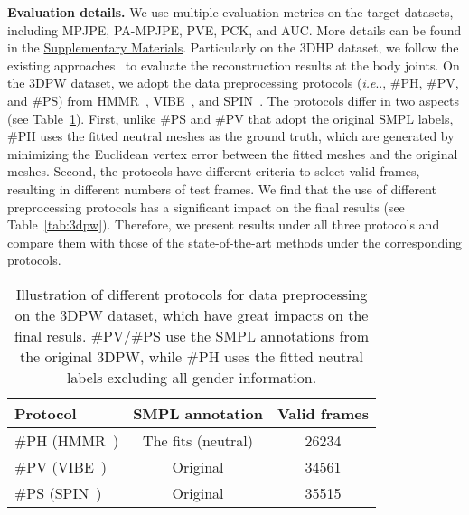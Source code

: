 \documentclass[10pt,journal,compsoc]{IEEEtran}
\makeatletter
\let\MYoriglatexcaption\caption
\renewcommand{\caption}[2][\relax]{\MYoriglatexcaption[#2]{#2}}
\DeclareRobustCommand\onedot{\futurelet\@let@token\@onedot}
\def\@onedot{\ifx\@let@token.\else.\null\fi\xspace}
\def\ie{\emph{i.e}\onedot} \def\Ie{\emph{I.e}\onedot}
\newcommand{\tab}[1]{Table~\ref{#1}}
\newcommand{\myparagraph}[1]{\vspace{5pt} \noindent \textbf{#1}}
\makeatother
\begin{document}
    
\myparagraph{Evaluation details.}
We use multiple evaluation metrics on the target datasets, including MPJPE, PA-MPJPE, PVE, PCK, and AUC. More details can be found in the \underline{Supplementary Materials}. 
Particularly on the 3DHP dataset, we follow the existing approaches~\cite{kolotouros2019learning, kanazawa2018end} to evaluate the reconstruction results at the  body joints.
On the 3DPW dataset, we adopt the data preprocessing protocols (\ie, \#PH, \#PV, and \#PS) from HMMR~\cite{DBLP:conf/cvpr/KanazawaZFM19}, VIBE~\cite{kocabas2020vibe}, and SPIN~\cite{kolotouros2019learning}.
The protocols differ in two aspects (see \tab{tab:setting_diff}). First, unlike \#PS and \#PV that adopt the original SMPL labels, \#PH uses the fitted neutral meshes as the ground truth, which are generated by minimizing the Euclidean vertex error between the fitted meshes and the original meshes. Second, the protocols have different criteria to select valid frames, resulting in different numbers of test frames.
We find that the use of different preprocessing protocols has a significant impact on the final results (see \tab{tab:3dpw}). Therefore, we present results under all three protocols and compare them with those of the state-of-the-art methods under the corresponding protocols.




\begin{table}[t]
    \centering
\caption{Illustration of different protocols for data preprocessing on the 3DPW dataset, which have great impacts on the final resuls. \#PV/\#PS use the SMPL annotations from the original 3DPW, while \#PH uses the fitted neutral labels excluding all gender information.}
    \vspace{-5pt}
\begin{tabular}{lcc}
    \toprule
        Protocol & SMPL annotation & Valid frames \\
    \midrule
        \#PH (HMMR~\cite{DBLP:conf/cvpr/KanazawaZFM19})   & The fits (neutral)        & 26234   \\
        \#PV (VIBE~\cite{kocabas2020vibe})   & Original            & 34561   \\
        \#PS (SPIN~\cite{kolotouros2019learning})   & Original            & 35515   \\
    \bottomrule
    \end{tabular}
\label{tab:setting_diff}
\end{table}
\end{document}
